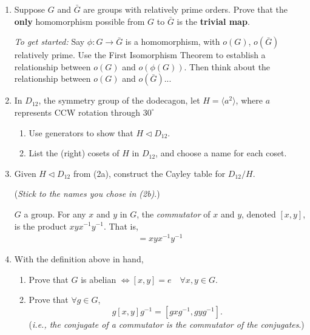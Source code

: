 \begin{enumerate}
    \item Suppose \( G \) and \( \bar{G} \) are groups with relatively prime orders. Prove that the \textbf{only} homomorphism possible from \( G \) to \( \bar{G} \) is the \textbf{trivial map}. \\ \steezybreak
    
    \textit{To get started:} Say \( \phi: G \to \bar{G} \) is a homomorphism, with \( o(G) \), \( o(\bar{G}) \) relatively prime. Use the First Isomorphism Theorem to establish a relationship between \( o(G) \) and \( o(\phi(G)) \). Then think about the relationship between \( o(G) \) and \( o(\bar{G}) \)... \\ \steezybreak
    
    \item In \( D_{12} \), the symmetry group of the dodecagon, let \( H = \langle a^2 \rangle \), where \( a \) represents CCW rotation through \( 30^\circ \)
    
    \begin{enumerate}
        \item Use generators to show that \( H \triangleleft D_{12} \).
        \item List the (right) cosets of \( H \) in \( D_{12} \), and choose a name for each coset. \\ \steezybreak
    \end{enumerate}
    
    \item Given \( H \triangleleft D_{12} \) from (2a), construct the Cayley table for \( D_{12} / H \).
    
    (\textit{Stick to the names you chose in (2b)}.) \\
    
    \begin{definition}[Commutator]
        \( G \) a group. For any \( x \) and \( y \) in \( G \), the \textit{commutator} of \( x \) and \( y \), denoted \( [x,y] \), is the product \( xyx^{-1}y^{-1} \). That is,
        \begin{align*}
            [x,y] = xyx^{-1}y^{-1}
        \end{align*}
    \end{definition}
    
    \item With the definition above in hand,
    \begin{enumerate}
        \item Prove that \( G \) is abelian \( \iff [x,y] = e \quad \forall x,y \in G \).
        \item Prove that \( \forall g \in G \), 
        \[
        g[x,y]g^{-1} = [g x g^{-1}, g y g^{-1}].
        \]
        (\textit{i.e., the conjugate of a commutator is the commutator of the conjugates}.) \\ \steezybreak
    \end{enumerate}
    

\end{enumerate}

